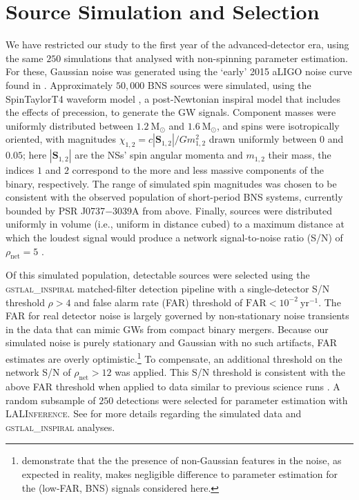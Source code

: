 \section{Source Simulation and Selection}\label{sec:sources}

We have restricted our study to the first year of the advanced-detector era, using the same $250$ simulations that \citet{Singer_2014} analysed with non-spinning parameter estimation. For these, Gaussian noise was generated using the `early' 2015 aLIGO noise curve found in \citet{Barsotti:2012}. Approximately $50,000$ BNS sources were simulated, using the SpinTaylorT4 waveform model \citep{Buonanno_2003,Buonanno_2009}, a post-Newtonian inspiral model that includes the effects of precession, to generate the GW signals. Component masses were uniformly distributed between $1.2~\mathrm{M}_\odot$ and $1.6~\mathrm{M}_\odot$, and spins were isotropically oriented, with magnitudes $\chi_{1,2} = c |\mathbf{S}_{1,2}|/G m_{1,2}^2$ drawn uniformly between $0$ and $0.05$; here $|\mathbf{S}_{1,2}|$ are the NSs' spin angular momenta and $m_{1,2}$ their mass, the indices $1$ and $2$ correspond to the more and less massive components of the binary, respectively.  The range of simulated spin magnitudes was chosen to be consistent with the observed population of short-period BNS systems, currently bounded by PSR J0737$-$3039A \citep{Burgay_2003,Brown_2012} from above.  Finally, sources were distributed uniformly in volume (i.e., uniform in distance cubed) to a maximum distance at which the loudest signal would produce a network signal-to-noise ratio (S/N) of $\rho_\mathrm{net} = 5$ \citep{Singer_2014}.

Of this simulated population, detectable sources were selected using the \textsc{gstlal\_inspiral} matched-filter detection pipeline \citep{Cannon_2012} with a single-detector S/N threshold $\rho>4$ and false alarm rate (FAR) threshold of $\mathrm{FAR}<10^{-2}~\mathrm{yr}^{-1}$.  The FAR for real detector noise is largely governed by non-stationary noise transients in the data that can mimic GWs from compact binary mergers.  Because our simulated noise is purely stationary and Gaussian with no such artifacts, FAR estimates are overly optimistic.\footnote{\citet{Berry_2014} demonstrate that the the presence of non-Gaussian features in the noise, as expected in reality, makes negligible difference to parameter estimation for the (low-FAR, BNS) signals considered here.} To compensate, an additional threshold on the network S/N of $\rho_\mathrm{net} > 12$ was applied. This S/N threshold is consistent with the above FAR threshold when applied to data similar to previous science runs \cite{2013arXiv1304.0670L,Berry_2014}. A random subsample of $250$ detections were selected for parameter estimation with \textsc{LALInference}. See \citet{Singer_2014} for more details regarding the simulated data and \textsc{gstlal\_inspiral} analyses.
  
  
  
  
  
  
  